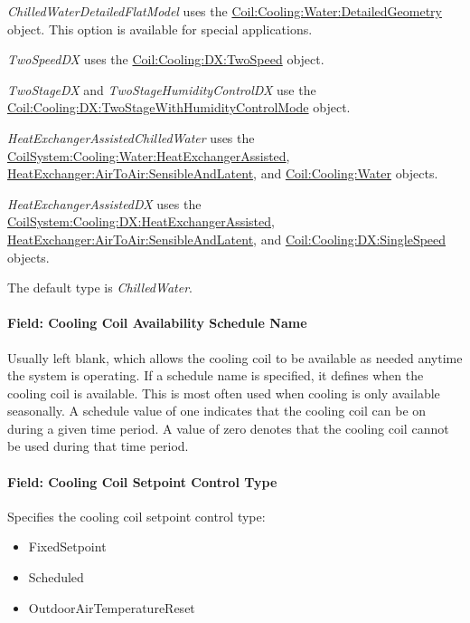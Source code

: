 \emph{ChilledWaterDetailedFlatModel} uses the \hyperref[coilcoolingwaterdetailedgeometry]{Coil:Cooling:Water:DetailedGeometry} object. This option is available for special applications.

\emph{TwoSpeedDX} uses the \hyperref[coilcoolingdxtwospeed]{Coil:Cooling:DX:TwoSpeed} object.

\emph{TwoStageDX} and \emph{TwoStageHumidityControlDX} use the \hyperref[coilcoolingdxtwostagewithhumiditycontrolmode]{Coil:Cooling:DX:TwoStageWithHumidityControlMode} object.

\emph{HeatExchangerAssistedChilledWater} uses the \hyperref[coilsystemcoolingwaterheatexchangerassisted]{CoilSystem:Cooling:Water:HeatExchangerAssisted}, \hyperref[heatexchangerairtoairsensibleandlatent]{HeatExchanger:AirToAir:SensibleAndLatent}, and \hyperref[coilcoolingwater]{Coil:Cooling:Water} objects.

\emph{HeatExchangerAssistedDX} uses the \hyperref[coilsystemcoolingdxheatexchangerassisted]{CoilSystem:Cooling:DX:HeatExchangerAssisted}, \hyperref[heatexchangerairtoairsensibleandlatent]{HeatExchanger:AirToAir:SensibleAndLatent}, and \hyperref[coilcoolingdxsinglespeed]{Coil:Cooling:DX:SingleSpeed} objects.

The default type is \emph{ChilledWater}.

\paragraph{Field: Cooling Coil Availability Schedule Name}\label{field-cooling-coil-availability-schedule-name-11}

Usually left blank, which allows the cooling coil to be available as needed anytime the system is operating. If a schedule name is specified, it defines when the cooling coil is available. This is most often used when cooling is only available seasonally. A schedule value of one indicates that the cooling coil can be on during a given time period. A value of zero denotes that the cooling coil cannot be used during that time period.

\paragraph{Field: Cooling Coil Setpoint Control Type}\label{field-cooling-coil-setpoint-control-type-2}

Specifies the cooling coil setpoint control type:

\begin{itemize}
\item
  FixedSetpoint
\item
  Scheduled
\item
  OutdoorAirTemperatureReset
\end{itemize}

